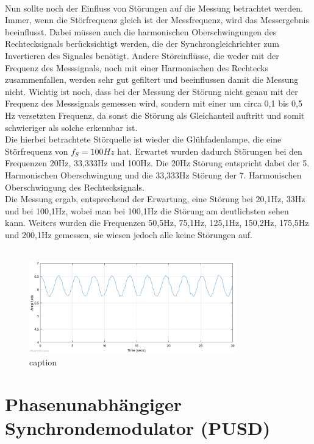 ~\\
Nun sollte noch der Einfluss von Störungen auf die Messung betrachtet werden. Immer, wenn die Störfrequenz gleich ist der Messfrequenz, wird das Messergebnis beeinflusst. Dabei müssen auch die harmonischen Oberschwingungen des Rechtecksignals berücksichtigt werden, die der Synchrongleichrichter zum Invertieren des Signales benötigt. Andere Störeinflüsse, die weder mit der Frequenz des Messsignals, noch mit einer Harmonischen des Rechtecks zusammenfallen, werden sehr gut gefiltert und beeinflussen damit die Messung nicht. Wichtig ist noch, dass bei der Messung der Störung nicht genau mit der Frequenz des Messsignals gemessen wird, sondern mit einer um circa 0,1 bis 0,5 Hz versetzten Frequenz, da sonst die Störung als Gleichanteil auftritt und somit schwieriger als solche erkennbar ist.
~\\
Die hierbei betrachtete Störquelle ist wieder die Glühfadenlampe, die eine Störfrequenz von $f_S = 100Hz$ hat. Erwartet wurden dadurch Störungen bei den Frequenzen 20Hz, 33,333Hz und 100Hz. Die 20Hz Störung entspricht dabei der 5. Harmonischen Oberschwingung und die 33,333Hz Störung der 7. Harmonischen Oberschwingung des Rechtecksignals.
~\\
Die Messung ergab, entsprechend der Erwartung, eine Störung bei 20,1Hz, 33Hz und bei 100,1Hz, wobei man bei 100,1Hz die Störung am deutlichsten sehen kann. Weiters wurden die Frequenzen 50,5Hz, 75,1Hz, 125,1Hz, 150,2Hz, 175,5Hz und 200,1Hz gemessen, sie wiesen jedoch alle keine Störungen auf.
~\\
~\\
\begin{figure}[h]
  \centering
  \includegraphics[width=0.8\textwidth]{./img/ch6/6_3_5_100Hz}
  \caption{caption}  
\end{figure} 

\section{Phasenunabhängiger Synchrondemodulator (PUSD)}

